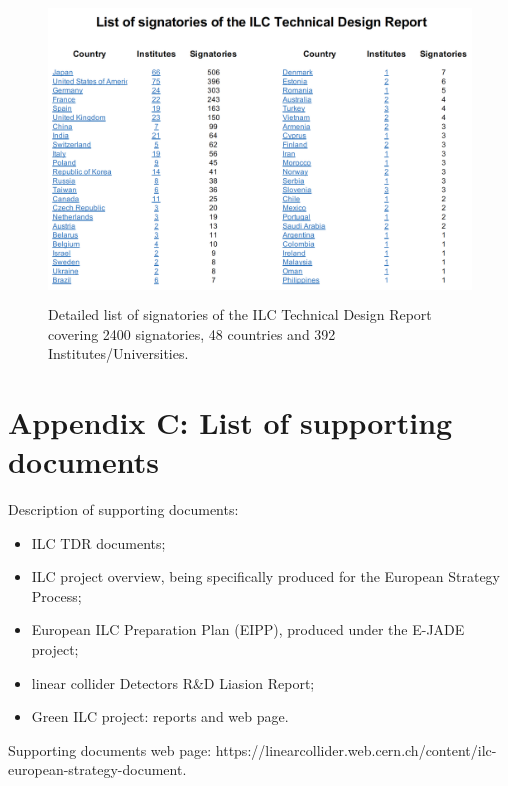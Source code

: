 \documentclass[%
 reprint,
 amsmath,amssymb,
 aps,
]{revtex4-1}
\begin{document}
 \begin{figure}[h]
 \begin{center}
 \includegraphics[width=\hsize,height=8cm]{figures/CountriesInstitutes.png}
\caption{Detailed list of signatories of the ILC Technical Design Report covering 2400 signatories, 48 countries and 392 Institutes/Universities. \label{TDRsignatories}}
 \end{center}
 \end{figure}

\newpage

\section*{\label{Appendix3} \Large{Appendix C: List of supporting documents} }
Description of supporting documents:
\begin{itemize}
\item
ILC TDR documents;
\item
ILC project overview, being specifically produced for the European Strategy Process;
\item
European ILC Preparation Plan (EIPP), produced under the E-JADE project;
\item
linear collider Detectors R\&D Liasion Report;
\item
Green ILC project: reports and web page.

\end{itemize}

Supporting documents web page: https://linearcollider.web.cern.ch/content/ilc-european-strategy-document.
\end{document}
